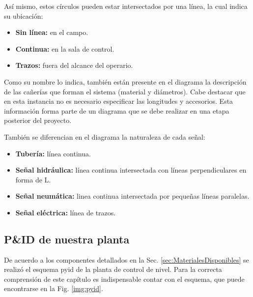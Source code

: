Así mismo, estos círculos pueden estar intersectados por una línea, la
cual
indica su ubicación:

\begin{itemize}
 \item \textbf{Sin línea:} en el campo.
 \item \textbf{Continua:} en la sala de control.
 \item \textbf{Trazos:} fuera del alcance del operario.
\end{itemize}

Como su nombre lo indica, también están presente en el diagrama la descripción
de las cañerías que forman el sistema (material y diámetros).
Cabe destacar que en esta instancia no es necesario especificar las
longitudes y accesorios.
Esta información forma parte de un diagrama que se debe realizar
en una etapa posterior del proyecto.

También se diferencian en el diagrama la naturaleza de cada señal:

\begin{itemize}
 \item \textbf{Tubería:} línea continua.
 \item \textbf{Señal hidráulica:} línea continua intersectada con líneas
perpendiculares en forma de L.
 \item \textbf{Señal neumática:} linea continua intersectada por pequeñas
líneas paralelas.
 \item \textbf{Señal eléctrica:} línea de trazos.
\end{itemize}

\subsection{P\&ID de nuestra planta}
De acuerdo a los componentes detallados en la Sec.
\ref{sec:MaterialesDisponibles} se realizó el esquema \gls{pyid} de la planta
de control de nivel.
Para la correcta comprensión de este capítulo es indispensable contar con el
esquema, que puede encontrarse en la Fig. \ref{img:pyid}.

